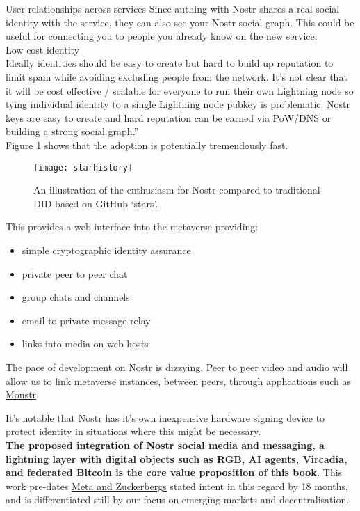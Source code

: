 {User relationships across services
Since authing with Nostr shares a real social identity with the service, they can also see your Nostr social graph. This could be useful for connecting you to people you already know on the new service.\\
Low cost identity\\
Ideally identities should be easy to create but hard to build up reputation to limit spam while avoiding excluding people from the network. It's not clear that it will be cost effective / scalable for everyone to run their own Lightning node so tying individual identity to a single Lightning node pubkey is problematic. Nostr keys are easy to create and hard reputation can be earned via PoW/DNS or building a strong social graph.''}\\
Figure \ref{fig:starhistory} shows that the adoption is potentially tremendously fast.
\begin{figure}
\texttt{[image: starhistory]}
  \caption{An illustration of the enthusiasm for Nostr compared to traditional DID based on GitHub `stars'.}
  \label{fig:starhistory}
\end{figure}
This provides a web interface into the metaverse providing:
\begin{itemize}
\item simple cryptographic identity assurance
\item private peer to peer chat
\item group chats and channels
\item email to private message relay
\item links into media on web hosts
\end{itemize}
The pace of development on Nostr is dizzying. Peer to peer video and audio will allow us to link metaverse instances, between peers, through applications such as \href{https://monstr.app/}{Monstr}.\par
It's notable that Nostr has it's own inexpensive \href{https://github.com/lnbits/nostr-signing-device}{hardware signing device} to protect identity in situations where this might be necessary.\\
\textbf{The proposed integration of Nostr social media and messaging, a lightning layer with digital objects such as RGB, AI agents, Vircadia, and federated Bitcoin is the core value proposition of this
book.} This work pre-dates \href{https://www.theverge.com/2023/4/26/23699633/mark-zuckerberg-meta-generative-ai-chatbots-instagram-facebook-whatsapp}{Meta and Zuckerbergs} stated intent in this regard by 18 months, and is differentiated still by our focus on emerging markets and decentralisation.
